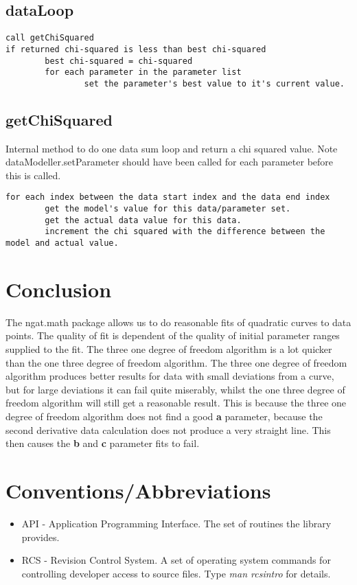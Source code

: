 \documentclass[10pt,a4paper]{article}
\begin{document}
\subsection{dataLoop}
\begin{verbatim}
call getChiSquared
if returned chi-squared is less than best chi-squared
        best chi-squared = chi-squared
        for each parameter in the parameter list
                set the parameter's best value to it's current value.
\end{verbatim}

\subsection{getChiSquared}
Internal method to do one data sum loop and return a chi squared value.
Note dataModeller.setParameter should have been called for each parameter before this is called.
\begin{verbatim}
for each index between the data start index and the data end index
        get the model's value for this data/parameter set.
        get the actual data value for this data.
        increment the chi squared with the difference between the model and actual value.
\end{verbatim}

\section{Conclusion}
The ngat.math package allows us to do reasonable fits of quadratic curves to data points. The quality of fit
is dependent of the quality of initial parameter ranges supplied to the fit. The three one degree of freedom 
algorithm is a lot quicker than the one three degree of freedom algorithm. The three one degree of freedom 
algorithm produces better results for data with small deviations from a curve, but for large deviations it
can fail quite miserably, whilst the one three degree of freedom algorithm will still get a reasonable 
result. This is because the three one degree of freedom 
algorithm does not find a good {\bf a} parameter, because the second derivative data calculation does
not produce a very straight line. This then causes the {\bf b} and {\bf c} parameter fits to fail.

\section{Conventions/Abbreviations}
\begin{itemize}
\item API - Application Programming Interface. The set of routines the library provides.
\item RCS - Revision Control System. A set of operating system commands for controlling developer access to
source files. Type {\em man rcsintro} for details.
\end{itemize}
\end{document}
